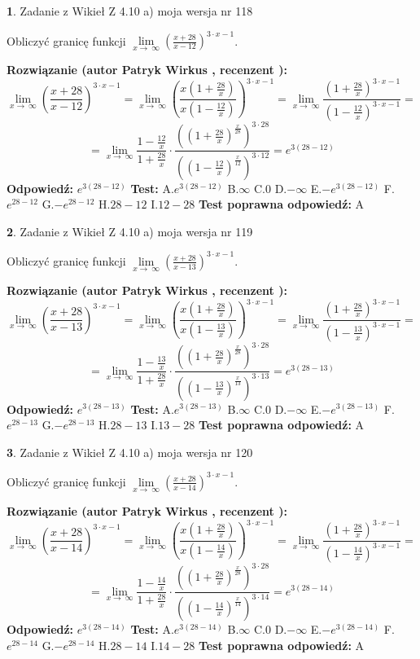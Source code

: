 \documentclass[12pt, a4paper]{article}
\theoremstyle{definition} %
\newtheorem{zad}{}
\newcommand{\zadStart}[1]{\begin{zad}#1\newline}
\newcommand{\zadStop}{\end{zad}}
\newcommand{\rozwStart}[2]{\noindent \textbf{Rozwiązanie (autor #1 , recenzent #2): }\newline}
\newcommand{\rozwStop}{\newline}
\newcommand{\odpStart}{\noindent \textbf{Odpowiedź:}\newline}
\newcommand{\odpStop}{\newline}
\newcommand{\testStart}{\noindent \textbf{Test:}\newline}
\newcommand{\testStop}{\newline}
\newcommand{\kluczStart}{\noindent \textbf{Test poprawna odpowiedź:}\newline}
\newcommand{\kluczStop}{\newline}
\begin{document}
\zadStart{Zadanie z Wikieł Z 4.10 a) moja wersja nr 118}


Obliczyć granicę funkcji  $\lim\limits_{x\to\ \infty}(\frac{x+28}{x-12})^{3\cdot x-1}$.
\zadStop
\rozwStart{Patryk Wirkus}{}
$$\lim\limits_{x\to\ \infty}(\frac{x+28}{x-12})^{3\cdot x-1} = \lim\limits_{x\to\ \infty}(\frac{x(1+\frac{28}{x})}{x(1-\frac{12}{x})})^{3\cdot x-1}=\lim\limits_{x\to\ \infty}\frac{(1+\frac{28}{x})^{3\cdot x-1}}{(1-\frac{12}{x})^{3\cdot x-1}}=$$
$$=\lim\limits_{x\to\ \infty}\frac{1-\frac{12}{x}}{1+\frac{28}{x}}\cdot\frac{((1+\frac{28}{x})^{\frac{x}{28}})^{3\cdot28}}{((1-\frac{12}{x})^{\frac{x}{12}})^{3\cdot12}}=e^{3(28-12)}$$
\rozwStop
\odpStart
$e^{3(28-12)}$
\odpStop
\testStart
A.$e^{3(28-12)}$ B.$\infty$ C.$0$ D.$-\infty$ E.$-e^{3(28-12)}$
F.$e^{28-12}$ G.$-e^{28-12}$
H.$28-12$
I.$12-28$
\testStop
\kluczStart
A
\kluczStop



\zadStart{Zadanie z Wikieł Z 4.10 a) moja wersja nr 119}


Obliczyć granicę funkcji  $\lim\limits_{x\to\ \infty}(\frac{x+28}{x-13})^{3\cdot x-1}$.
\zadStop
\rozwStart{Patryk Wirkus}{}
$$\lim\limits_{x\to\ \infty}(\frac{x+28}{x-13})^{3\cdot x-1} = \lim\limits_{x\to\ \infty}(\frac{x(1+\frac{28}{x})}{x(1-\frac{13}{x})})^{3\cdot x-1}=\lim\limits_{x\to\ \infty}\frac{(1+\frac{28}{x})^{3\cdot x-1}}{(1-\frac{13}{x})^{3\cdot x-1}}=$$
$$=\lim\limits_{x\to\ \infty}\frac{1-\frac{13}{x}}{1+\frac{28}{x}}\cdot\frac{((1+\frac{28}{x})^{\frac{x}{28}})^{3\cdot28}}{((1-\frac{13}{x})^{\frac{x}{13}})^{3\cdot13}}=e^{3(28-13)}$$
\rozwStop
\odpStart
$e^{3(28-13)}$
\odpStop
\testStart
A.$e^{3(28-13)}$ B.$\infty$ C.$0$ D.$-\infty$ E.$-e^{3(28-13)}$
F.$e^{28-13}$ G.$-e^{28-13}$
H.$28-13$
I.$13-28$
\testStop
\kluczStart
A
\kluczStop



\zadStart{Zadanie z Wikieł Z 4.10 a) moja wersja nr 120}


Obliczyć granicę funkcji  $\lim\limits_{x\to\ \infty}(\frac{x+28}{x-14})^{3\cdot x-1}$.
\zadStop
\rozwStart{Patryk Wirkus}{}
$$\lim\limits_{x\to\ \infty}(\frac{x+28}{x-14})^{3\cdot x-1} = \lim\limits_{x\to\ \infty}(\frac{x(1+\frac{28}{x})}{x(1-\frac{14}{x})})^{3\cdot x-1}=\lim\limits_{x\to\ \infty}\frac{(1+\frac{28}{x})^{3\cdot x-1}}{(1-\frac{14}{x})^{3\cdot x-1}}=$$
$$=\lim\limits_{x\to\ \infty}\frac{1-\frac{14}{x}}{1+\frac{28}{x}}\cdot\frac{((1+\frac{28}{x})^{\frac{x}{28}})^{3\cdot28}}{((1-\frac{14}{x})^{\frac{x}{14}})^{3\cdot14}}=e^{3(28-14)}$$
\rozwStop
\odpStart
$e^{3(28-14)}$
\odpStop
\testStart
A.$e^{3(28-14)}$ B.$\infty$ C.$0$ D.$-\infty$ E.$-e^{3(28-14)}$
F.$e^{28-14}$ G.$-e^{28-14}$
H.$28-14$
I.$14-28$
\testStop
\kluczStart
A
\kluczStop
\end{document}
